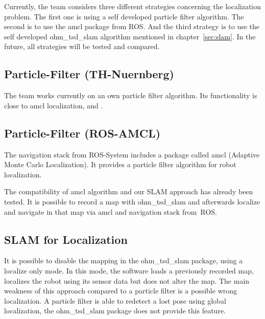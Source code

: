 
Currently, the team considers three different strategies concerning the localization problem. The first one is using a self developed particle filter algorithm. The second is to use the amcl package from ROS. And the third strategy is to use the self developed ohm\_tsd\_slam algorithm mentioned in chapter~\ref{sec:slam}. In the future, all strategies will be tested and compared.

\subsection{Particle-Filter (TH-Nuernberg)}
The team works currently on an own particle filter algorithm. Its functionality is close to amcl localization, \cite{pf_fox} and \cite{pr}. 

\subsection{Particle-Filter (ROS-AMCL)}
The navigation stack from ROS-System includes a package called amcl (Adaptive Monte Carlo Localization). It provides a particle filter algorithm for robot localization. 

The compatibility of amcl algorithm and our SLAM approach has already been tested. It is possible to record a map with ohm\_tsd\_slam and afterwards localize and navigate in that map via amcl and navigation stack from~ROS.

\subsection{SLAM for Localization}
It is possible to disable the mapping in the ohm\_tsd\_slam package, using a localize only mode. In this mode, the software loads a previously recorded map, localizes the robot using its sensor data but does not alter the map. The main weakness of this approach compared to a particle filter is a possible wrong localization. A particle filter is able to redetect a lost pose using global localization, the ohm\_tsd\_slam package does not provide this feature.

